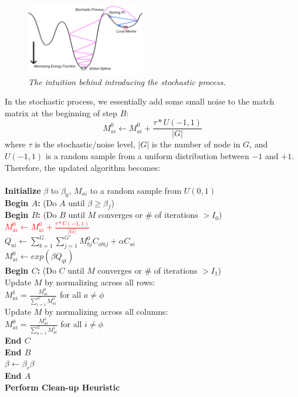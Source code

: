 \begin{figure}[h]
	\centering
	\captionsetup{justification=centering}
	\includegraphics[width=0.46\textwidth]{figs/stochastic.png}
	\caption[Caption for LOF]{\emph{The intuition behind introducing the stochastic process.}}
	\label{fig:stochastic}
\end{figure}

In the stochastic process, we essentially add some small noise to the match matrix at the beginning of step \textbf{$B$}:
\begin{equation} 
M_{ai}^{0} \leftarrow M_{ai}^{0} + \frac{\tau * U(-1,1)}{|G|}
\end{equation}
where $\tau$ is the stochastic/noise level, $|G|$ is the number of node in $G$, and $U(-1,1)$ is a random sample from a uniform distribution between $-1$ and $+1$.\\

Therefore, the updated algorithm becomes:\\
\\
\textbf{Initialize} $\beta$ to $\beta_{0}$, $M_{ai}$ to a random sample from $U(0,1)$\\
\textbf{Begin $A$:} (Do $A$ until $\beta \geq \beta_{f}$)\\
\indent \textbf{Begin $B$:} (Do $B$ until $M$ converges or \# of iterations $>I_0$)\\
\indent \textcolor{red}{$M_{ai}^{0} \leftarrow M_{ai}^{0} + \frac{\tau * U(-1,1)}{|G|}$}\\
\indent $Q_{ai} \leftarrow \sum_{b=1}^{G}\sum_{j=1}^{G'}M_{bj}^{0}C_{abij}+\alpha C_{ai}$\\
\indent $M_{ai}^{0} \leftarrow exp(\beta Q_{qi})$\\
\indent \indent \textbf{Begin $C$:} (Do $C$ until $M$ converges or \# of iterations $>I_1$)\\
\indent \indent  Update $M$ by normalizing across all rows:\\
\indent \indent  $M_{ai}^{1}=\frac{M_{ai}^{0}}{\sum_{i=1}^{G'}M_{ai}^{0}}$ for all $a\neq\phi$\\
\indent \indent  Update $M$ by normalizing across all columns:\\
\indent \indent  $M_{ai}^{0}=\frac{M_{ai}^{1}}{\sum_{a=1}^{G}M_{ai}^{1}}$ for all $i\neq\phi$\\
\indent \indent \textbf{End $C$}\\
\indent \textbf{End $B$}\\
$\beta\leftarrow\beta_{r}\beta$\\
\textbf{End $A$}\\
\textbf{Perform Clean-up Heuristic}\\

